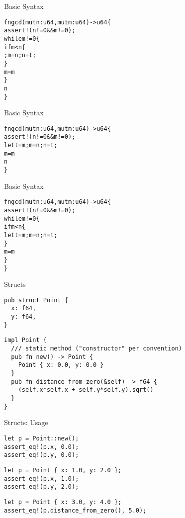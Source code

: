 
\begin{frame}[fragile]{Basic Syntax}
\begin{alltt}
fn gcd(mut n: u64, mut m: u64) -> u64 \{
    assert!(n != 0 && m != 0);
    while m != 0 \{
        if m < n \{
            ; m = n; n = t;
        \}
        m = m % n;
    \}
    n
\}
\end{alltt}
\end{frame}


\begin{frame}[fragile]{Basic Syntax}
\begin{alltt}
fn gcd(mut n: u64, mut m: u64) -> u64 \{
    assert!(n != 0 && m != 0);
            let t = m; m = n; n = t;
        \hi{\}}
        m = m % n;
    \hi{\}}
    n
\}
\end{alltt}
\end{frame}


\begin{frame}[fragile]{Basic Syntax}
\begin{alltt}
fn gcd(mut n: u64, mut m: u64) -> u64 \{
    assert!(n != 0 && m != 0);
    while m != 0 \{
        if m < n \{
            let t = m; m = n; n = t;
        \}
        m = m % n;
    \}
\}
\end{alltt}
\end{frame}


\begin{frame}[fragile]{Structs}
\begin{verbatim}
pub struct Point {
  x: f64,
  y: f64,
}
\end{verbatim}
\pause
\begin{verbatim}
impl Point {
  /// static method ("constructor" per convention)
  pub fn new() -> Point {
    Point { x: 0.0, y: 0.0 }
  }
  pub fn distance_from_zero(&self) -> f64 {
    (self.x*self.x + self.y*self.y).sqrt()
  }
}
\end{verbatim}
\end{frame}

\begin{frame}[fragile]{Structs: Usage}
\begin{verbatim}
let p = Point::new();
assert_eq!(p.x, 0.0);
assert_eq!(p.y, 0.0);
\end{verbatim}
\begin{verbatim}
let p = Point { x: 1.0, y: 2.0 };
assert_eq!(p.x, 1.0);
assert_eq!(p.y, 2.0);
\end{verbatim}
\begin{verbatim}
let p = Point { x: 3.0, y: 4.0 };
assert_eq!(p.distance_from_zero(), 5.0);
\end{verbatim}
\end{frame}

